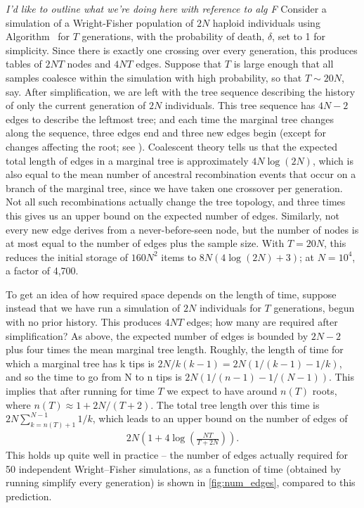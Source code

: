 \documentclass{article}
\newcommand{\jda}[1]{{\em \color{cyan} #1}}
\begin{document}
\jda{I'd like to outline what we're doing here with reference to alg F}
Consider a simulation of a Wright-Fisher population of $2N$ haploid individuals 
using Algorithm~
for $T$ generations,
with the probability of death, $\delta$, set to 1 for simplicity.
Since there is exactly one crossing over every generation,
this produces tables of 
$2NT$ nodes and
$4NT$ edges.
Suppose that $T$ is large enough that all samples coalesce within the simulation with high probability,
so that $T \sim 20N$, say.
After simplification, we are left with the tree sequence describing the history
of only the current generation of $2N$ individuals.
This tree sequence has $4N-2$ edges to describe the leftmost tree;
and each time the marginal tree changes along the sequence,
three edges end and three new edges begin (except for changes affecting the root; see \citet{kelleher2016efficient}).
Coalescent theory tells us that 
the expected total length of edges in a marginal tree is approximately $4N\log(2N)$,
which is also equal to the mean number of ancestral recombination events that occur on a branch of the marginal tree,
since we have taken one crossover per generation.
Not all such recombinations actually change the tree topology,
and three times this gives us an upper bound on the expected number of edges.
Similarly, not every new edge derives from a never-before-seen node,
but the number of nodes is at most equal to the number of edges plus the sample size.
With $T=20N$, this reduces the initial storage of $160 N^2$ items to $8N(4\log(2N) + 3)$;
at $N=10^4$, a factor of 4,700.

To get an idea of how required space depends on the length of time,
suppose instead that we have run a simulation of $2N$ individuals for $T$ generations,
begun with no prior history.
This produces $4NT$ edges; how many are required after simplification?
As above, the expected number of edges is bounded by $2N-2$ plus four times the mean marginal tree length.
Roughly, the length of time for which a marginal tree has k tips is 
$2N/k(k-1) = 2N(1/(k-1) - 1/k)$,
and so the time to go from N to n tips is $2N(1/(n-1) - 1/(N-1))$.
This implies that after running for time $T$ we expect to 
have around $n(T)$ roots, where $n(T) \approx 1 + 2N/(T+2)$.
The total tree length over this time is 
$2 N \sum_{k=n(T)+1}^{N-1} 1/k$, which 
leads to an upper bound on the number of edges of
\begin{align*}
    2 N \left( 1 + 4 \log\left( \frac{NT}{T + 2 N} \right)\right) .
\end{align*}
This holds up quite well in practice --
the number of edges actually required for 50 independent Wright--Fisher simulations,
as a function of time (obtained by running simplify every generation)
is shown in \ref{fig:num_edges}, compared to this prediction.
\end{document}
